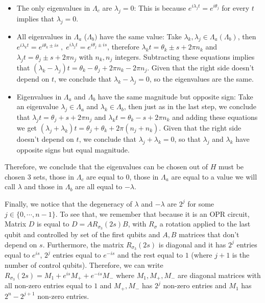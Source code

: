 \begin{itemize}
\item The only eigenvalues in $\Lambda_c$ are $\lambda_j = 0$: This is because  $e^{i \lambda_j t}  = e^{i \theta_j}$ for every $t$ implies that $\lambda_j = 0$.
\item All eigenvalues in $\Lambda_a$ ($\Lambda_b)$ have the same value:
Take $\lambda_k , \lambda_j \in \Lambda_a (\Lambda_b)$, then $e^{i\lambda_k t} = e^{i \theta_k \pm is} \; ,\; e^{i\lambda_j t} = e^{i\theta_j \pm is}$,
therefore $\lambda_k t = \theta_k \pm s + 2\pi n_k$ and $\lambda_j t = \theta_j \pm s + 2\pi n_j$ with $n_k, n_j$ integers.
 Subtracting these equations implies that $(\lambda_k - \lambda_j)t = \theta_k - \theta_j + 2\pi n_k - 2\pi n_j$. 
 Given that the right side doesn't depend on $t$, we conclude that $\lambda_k - \lambda_j= 0$, so the eigenvalues are the same.
 
\item Eigenvalues in $\Lambda_a$ and $\Lambda_b$ have the same magnitude but opposite sign: 
Take an eigenvalue $\lambda_j \in \Lambda_a$ and $\lambda_k \in \Lambda_b$, 
then just as in the last step, we conclude that $\lambda_jt =  \theta_j + s + 2\pi n_j$ and $\lambda_kt = \theta_k - s + 2\pi n_k$
and adding these equations we get $(\lambda_j+ \lambda_k)t = \theta_j + \theta_k + 2\pi (n_j + n_k)$. 
Given that the right side doesn't depend on $t$, we conclude that $\lambda_j + \lambda_k =0$, so that $\lambda_j$ and $\lambda_k$ have opposite signs but equal magnitude.
\end{itemize}
Therefore, we conclude that the eigenvalues can be chosen out of $H$ must be chosen 3 sets, 
those in $\Lambda_c$ are equal to $0$, those in $\Lambda_a$ are equal to a value we
will call $\lambda$ and those in $\Lambda_b$ are all equal to $-\lambda$. 

Finally, we notice that the degeneracy of $\lambda$ and
$-\lambda$ are $2^j$ for some $j \in \{0, \cdots, n-1\}$.
 To see that, we remember that because it is an OPR circuit, 
Matrix $D$ is equal to $D = A R_{\sigma_3} (2s)B$, 
with $R_{\sigma}$ a rotation applied to the last qubit and controlled by set of the first qubits and $A,B$ 
matrices that don't depend on $s$.
Furthermore, the matrix $R_{\sigma_3}(2s)$ is diagonal and
it has $2^j$ entries equal to $e^{is}$, $2^j$ entries equal to $e^{-is}$ and the rest equal to $1$ 
(where $j+1$ is the number of  control qubits). 
Therefore, we can write $R_{\sigma_3}(2s) = M_1 + e^{is} M_+ + e^{-is} M_-$
 where $M_1, M_+, M_-$ are diagonal matrices with all non-zero entries equal to $1$ and 
$M_+, M_-$ has $2^j$ non-zero entries and $M_1$ has $2^n - 2^{j+1}$ non-zero entries.

